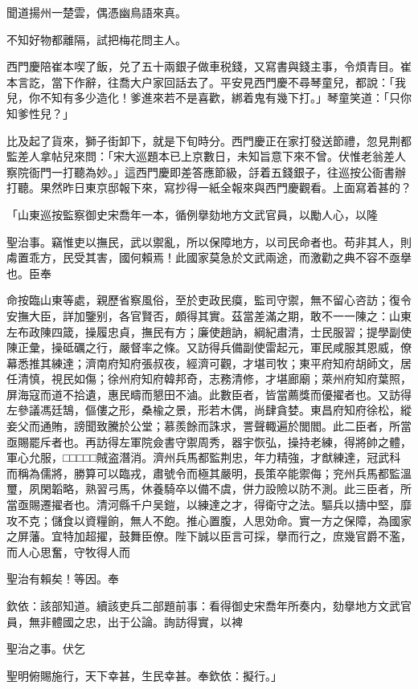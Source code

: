 聞道揚州一楚雲，偶憑幽鳥語來真。

不知好物都離隔，試把梅花問主人。

西門慶陪崔本喫了飯，兑了五十兩銀子做車税錢，又寫書與錢主事，令煩青目。崔本言訖，當下作辭，往喬大户家回話去了。平安見西門慶不尋琴童兒，都說：「我兒，你不知有多少造化！爹進來若不是喜歡，綁着鬼有幾下打。」琴童笑道：「只你知爹性兒？」

比及起了貨來，獅子街卸下，就是下旬時分。西門慶正在家打發送節禮，忽見荆都監差人拿帖兒來問：「宋大巡題本已上京數日，未知旨意下來不曾。伏惟老翁差人察院衙門一打聽為妙。」這西門慶即差答應節級，㧱着五錢銀子，往巡按公衙書辦打聽。果然昨日東京邸報下來，寫抄得一紙全報來與西門慶觀看。上面寫着甚的？

「山東巡按監察御史宋喬年一本，循例擧劾地方文武官員，以勵人心，以隆

聖治事。竊惟吏以撫民，武以禦亂，所以保障地方，以司民命者也。苟非其人，則䖏置乖方，民受其害，國何賴焉！此國家莫急於文武兩途，而激勸之典不容不亟擧也。臣奉

命按臨山東等處，親歷省察風俗，至於吏政民瘼，監司守禦，無不留心咨訪；復令安撫大臣，詳加鑒别，各官賢否，頗得其實。茲當差滿之期，敢不一一陳之：山東左布政陳四箴，操履忠貞，撫民有方；廉使趙訥，綱紀肅清，士民服習；提學副使陳正彙，操砥礪之行，嚴督率之條。又訪得兵備副使雷起元，軍民咸服其恩威，僚幕悉推其練達；濟南府知府張叔夜，經濟可觀，才堪司牧；東平府知府胡師文，居任清慎，視民如傷；徐州府知府韓邦奇，志務清修，才堪廊廟；萊州府知府葉照，屏海寇而道不拾遺，惠民疇而懇田不滷。此數臣者，皆當薦獎而優擢者也。又訪得左參議馮廷鵠，傴僂之形，桑楡之景，形若木偶，尚肆貪婪。東昌府知府徐松，縱妾父而通賄，謗聞致騰於公堂；慕羨餘而誅求，詈聲輙遍於閭閻。此二臣者，所當亟賜罷斥者也。再訪得左軍院僉書守禦周秀，器宇恢弘，操持老練，得將帥之體，軍心允服，□□□□□賊盗潛消。濟州兵馬都監荆忠，年力精強，才猷練達，冠武科而稱為儒將，勝算可以臨戎，肅號令而極其嚴明，長策卒能禦侮；兖州兵馬都監溫璽，夙閑韜略，熟習弓馬，休養騎卒以備不虞，併力設險以防不測。此三臣者，所當亟賜遷擢者也。清河縣千户吴鎧，以練達之才，得衛守之法。驅兵以擣中堅，靡攻不克；儲食以資糧餉，無人不飽。推心置腹，人思効命。實一方之保障，為國家之屏藩。宜特加超擢，鼓舞臣僚。陛下誠以臣言可採，擧而行之，庶幾官爵不濫，而人心思奮，守牧得人而

聖治有賴矣！等因。奉

欽依：該部知道。續該吏兵二部題前事：看得御史宋喬年所奏内，劾擧地方文武官員，無非體國之忠，出于公論。詢訪得實，以裨

聖治之事。伏乞

聖明俯賜施行，天下幸甚，生民幸甚。奉欽依：擬行。」

